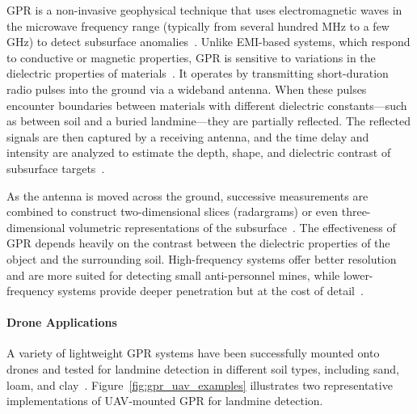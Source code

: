 \gls{GPR} is a non-invasive geophysical technique that uses electromagnetic waves in the microwave frequency range (typically from several hundred MHz to a few GHz) to detect subsurface anomalies~\cite{gichd2006guidebook}. Unlike \gls{EMI}-based systems, which respond to conductive or magnetic properties, \gls{GPR} is sensitive to variations in the dielectric properties of materials~\cite{Gooneratne2004ARO}. It operates by transmitting short-duration radio pulses into the ground via a wideband antenna. When these pulses encounter boundaries between materials with different dielectric constants—such as between soil and a buried landmine—they are partially reflected. The reflected signals are then captured by a receiving antenna, and the time delay and intensity are analyzed to estimate the depth, shape, and dielectric contrast of subsurface targets~\cite{alqudsi2021review,paik2002image}.

As the antenna is moved across the ground, successive measurements are combined to construct two-dimensional slices (radargrams) or even three-dimensional volumetric representations of the subsurface~\cite{Bruschini1997ASO}. The effectiveness of \gls{GPR} depends heavily on the contrast between the dielectric properties of the object and the surrounding soil. High-frequency systems offer better resolution and are more suited for detecting small anti-personnel mines, while lower-frequency systems provide deeper penetration but at the cost of detail~\cite{gichd2006guidebook}.

\paragraph{Drone Applications} A variety of lightweight \gls{GPR} systems have been successfully mounted onto drones and tested for landmine detection in different soil types, including sand, loam, and clay~\cite{cerquera2017uav,vsipovs2020lightweight,colorado2017integrated,garcia2020airborne,garcia2019autonomous,burr2018design,fernandez2021development,lee2023modeling,sipos2017drone,garcia2022safedrone,schartel2018uav,chen2023ground}. Figure~\ref{fig:gpr_uav_examples} illustrates two representative implementations of \gls{UAV}-mounted \gls{GPR} for landmine detection.

